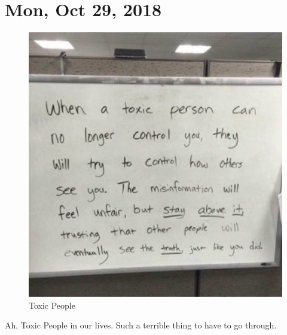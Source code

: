 \section{Mon, Oct 29, 2018}

\begin{figure}[h!]
  \centering
  \includegraphics[width=.5\linewidth]{2018/images/toxic.jpg}
  \caption{Toxic People}
  \label{fig:rabbit}
\end{figure}

Ah, Toxic People in our lives. Such a terrible thing to have to go through.